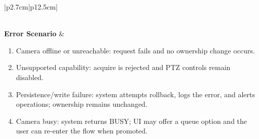\begin{table}[H]
\begin{tabular}{|p{2.7cm}|p{12.5cm}|}
\begin{minipage}[t]{\linewidth}
        \end{minipage} \\
        \hline
        \textbf{Error Scenario} & \begin{minipage}[t]{\linewidth}
            \begin{enumerate}[topsep=0pt,itemsep=1pt,parsep=0pt,partopsep=0pt]
                \item Camera offline or unreachable: request fails and no ownership change occurs.
                \item Unsupported capability: acquire is rejected and PTZ controls remain disabled.
                \item Persistence/write failure: system attempts rollback, logs the error, and alerts operations; ownership remains unchanged.
                \item Camera busy: system returns BUSY; UI may offer a queue option and the user can re-enter the flow when promoted.
            \end{enumerate}
        \end{minipage} \\
        \hline
    \end{tabular}
    \label{tab:eng-acquire-release-camera}
\end{table}





















